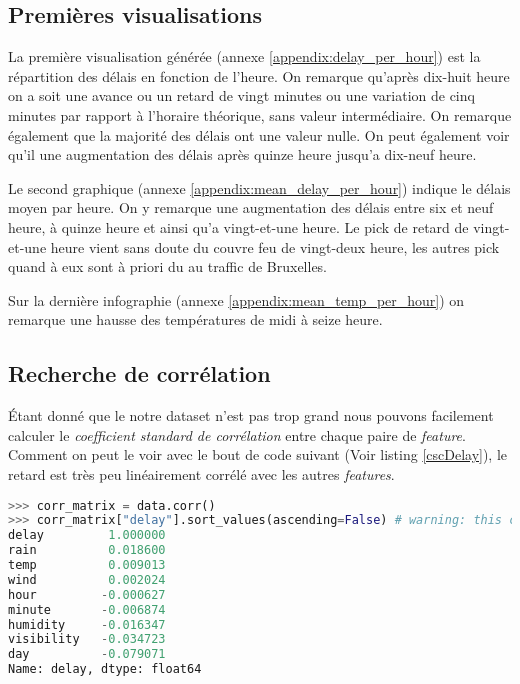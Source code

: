 \subsection{Premières visualisations}
La première visualisation générée (annexe \ref{appendix:delay_per_hour}) est la répartition des délais en fonction de l'heure. On remarque qu'après dix-huit heure on a soit une avance ou un retard de vingt minutes ou une variation de cinq minutes par rapport à l'horaire théorique, sans valeur intermédiaire. On remarque également que la majorité des délais ont une valeur nulle. On peut également voir qu'il une augmentation des délais après quinze heure jusqu'a dix-neuf heure.

Le second graphique (annexe \ref{appendix:mean_delay_per_hour}) indique le délais moyen par heure. On y remarque une augmentation des délais entre six et neuf heure, à quinze heure et ainsi qu'a vingt-et-une heure. Le pick de retard de vingt-et-une heure vient sans doute du couvre feu de vingt-deux heure, les autres pick quand à eux sont à priori du au traffic de Bruxelles.

Sur la dernière infographie (annexe \ref{appendix:mean_temp_per_hour}) on remarque une hausse des températures de midi à seize heure.

\subsection{Recherche de corrélation}
Étant donné que le notre dataset n'est pas trop grand nous pouvons facilement calculer le \textit{coefficient standard de corrélation} entre chaque paire de \textit{feature}. Comment on peut le voir avec le bout de code suivant (Voir listing \ref{cscDelay}), le retard est très peu linéairement corrélé avec les autres \textit{features}.

\begin{lstlisting}[language=Python, caption=Coefficient standard de corrélation pour la \textit{feature} \lstinline!delay!., label=cscDelay]
>>> corr_matrix = data.corr()
>>> corr_matrix["delay"].sort_values(ascending=False) # warning: this check only linear correlation
delay         1.000000
rain          0.018600
temp          0.009013
wind          0.002024
hour         -0.000627
minute       -0.006874
humidity     -0.016347
visibility   -0.034723
day          -0.079071
Name: delay, dtype: float64
\end{lstlisting}

